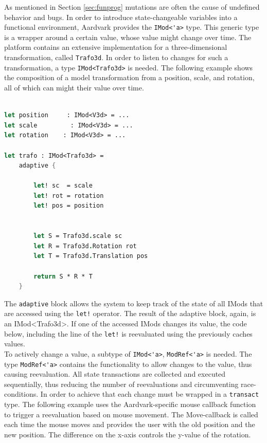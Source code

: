 As mentioned in Section \ref{sec:funprog} mutations are often the cause of undefined behavior and bugs. In order to introduce state-changeable variables into a functional environment, Aardvark provides the \verb|IMod<'a>| type. This generic type is a wrapper around a certain value, whose value might change over time. The platform contains an extensive implementation for a three-dimensional transformation, called \verb|Trafo3d|. In order to listen to changes for such a transformation, a type \verb|IMod<Trafo3d>| is needed. The following example shows the composition of a model transformation from a position, scale, and rotation, all of which can might their value over time. 

\begin{lstlisting}[language = FSharp]

let position     : IMod<V3d> = ... 
let scale         : IMod<V3d> = ... 
let rotation    : IMod<V3d> = ...

let trafo : IMod<Trafo3d> = 
    adaptive {
    
        let! sc  = scale
        let! rot = rotation
        let! pos = position
        
        
        let S = Trafo3d.scale sc
        let R = Trafo3d.Rotation rot
        let T = Trafo3d.Translation pos
        
        return S * R * T
    }
\end{lstlisting}

The \verb|adaptive| block allows the system to keep track of the state of all IMods that are accessed using the \verb|let!| operator. The result of the adaptive block, again, is an IMod<Trafo3d>. If one of the accessed IMods changes its value, the code below, including the line of the \verb|let!| is reevaluated using the previously caches values. 
\\

To actively change a value, a subtype of \verb|IMod<'a>|, \verb|ModRef<'a>| is needed. The type \verb|ModRef<'a>| contains the functionality to allow changes to the value, thus causing reevaluation. All state transactions are collected and executed sequentially, thus reducing the number of reevaluations and circumventing race-conditions. In order to achieve that each change must be wrapped in a \verb|transact| type. 
The following example uses the Aardvark-specific mouse callback function to trigger a reevaluation based on mouse movement. The Move-callback is called each time the mouse moves and provides the user with the old position and the new position. The difference on the x-axis controls the y-value of the rotation. 

